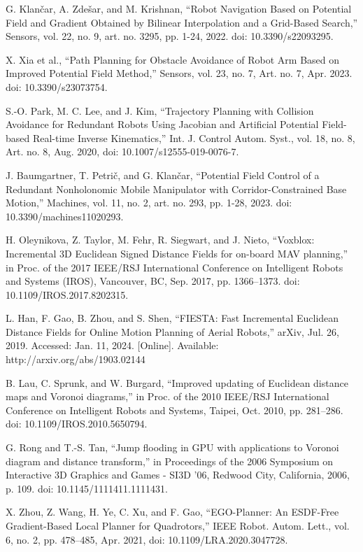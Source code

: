 \documentclass[letterpaper, 10 pt, conference]{ieeeconf}  %
\begin{document}
\begin{thebibliography}{99}
G. Klančar, A. Zdešar, and M. Krishnan, “Robot Navigation Based on Potential Field and Gradient Obtained by Bilinear Interpolation and a Grid-Based Search,” Sensors, vol. 22, no. 9, art. no. 3295, pp. 1-24, 2022. doi: 10.3390/s22093295.

 X. Xia et al., “Path Planning for Obstacle Avoidance of Robot Arm Based on Improved Potential Field Method,” Sensors, vol. 23, no. 7, Art. no. 7, Apr. 2023. doi: 10.3390/s23073754.

 S.-O. Park, M. C. Lee, and J. Kim, “Trajectory Planning with Collision Avoidance for Redundant Robots Using Jacobian and Artificial Potential Field-based Real-time Inverse Kinematics,” Int. J. Control Autom. Syst., vol. 18, no. 8, Art. no. 8, Aug. 2020, doi: 10.1007/s12555-019-0076-7.

J. Baumgartner, T. Petrič, and G. Klančar, “Potential Field Control of a Redundant Nonholonomic Mobile Manipulator with Corridor-Constrained Base Motion,” Machines, vol. 11, no. 2, art. no. 293, pp. 1-28, 2023. doi: 10.3390/machines11020293.

 H. Oleynikova, Z. Taylor, M. Fehr, R. Siegwart, and J. Nieto, “Voxblox: Incremental 3D Euclidean Signed Distance Fields for on-board MAV planning,” in Proc. of the 2017 IEEE/RSJ International Conference on Intelligent Robots and Systems (IROS), Vancouver, BC, Sep. 2017, pp. 1366–1373. doi: 10.1109/IROS.2017.8202315.

 L. Han, F. Gao, B. Zhou, and S. Shen, “FIESTA: Fast Incremental Euclidean Distance Fields for Online Motion Planning of Aerial Robots,” arXiv, Jul. 26, 2019. Accessed: Jan. 11, 2024. [Online]. Available: http://arxiv.org/abs/1903.02144

 B. Lau, C. Sprunk, and W. Burgard, “Improved updating of Euclidean distance maps and Voronoi diagrams,” in Proc. of the 2010 IEEE/RSJ International Conference on Intelligent Robots and Systems, Taipei, Oct. 2010, pp. 281–286. doi: 10.1109/IROS.2010.5650794.

 G. Rong and T.-S. Tan, “Jump flooding in GPU with applications to Voronoi diagram and distance transform,” in Proceedings of the 2006 Symposium on Interactive 3D Graphics and Games - SI3D ’06, Redwood City, California, 2006, p. 109. doi: 10.1145/1111411.1111431.

 X. Zhou, Z. Wang, H. Ye, C. Xu, and F. Gao, “EGO-Planner: An ESDF-Free Gradient-Based Local Planner for Quadrotors,” IEEE Robot. Autom. Lett., vol. 6, no. 2, pp. 478–485, Apr. 2021, doi: 10.1109/LRA.2020.3047728.








\end{thebibliography}
\end{document}
